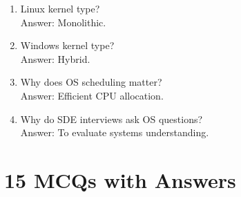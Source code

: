 \begin{enumerate}
\item Linux kernel type?\\
Answer: Monolithic.

\item Windows kernel type?\\
Answer: Hybrid.

\item Why does OS scheduling matter?\\
Answer: Efficient CPU allocation.

\item Why do SDE interviews ask OS questions?\\
Answer: To evaluate systems understanding.
\end{enumerate}

\section{15 MCQs with Answers}

